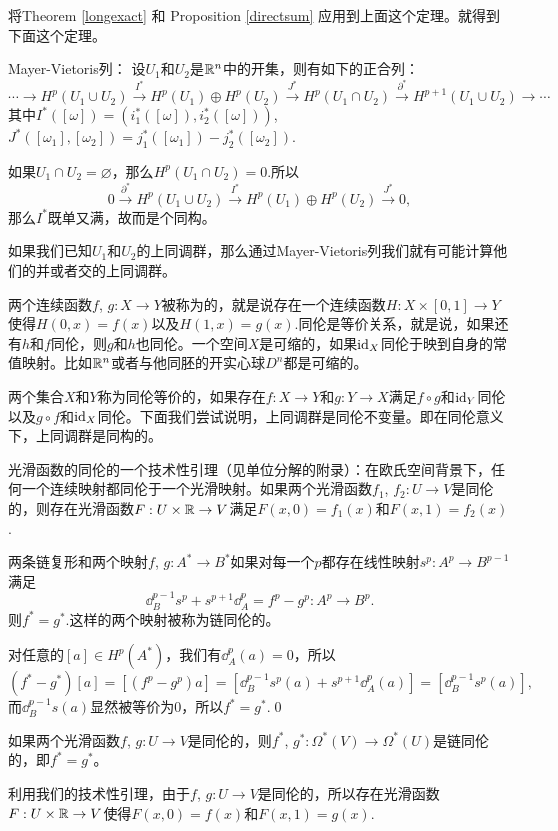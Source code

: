 将Theorem \eqref{longexact} 和 Proposition \eqref{directsum} 应用到上面这个定理。就得到下面这个定理。

\theo Mayer-Vietoris列：
设$U_1$和$U_2$是$\mathbb{R}^n$中的开集，则有如下的正合列：
\[
\cdots\to H^p(U_1\cup U_2)\xrightarrow{I^*}H^p(U_1)\oplus H^p(U_2)\xrightarrow{J^*}H^p(U_1\cap U_2)\xrightarrow{\partial^*}H^{p+1}(U_1\cup U_2)
\to \cdots
\]
其中$I^*([\omega])=(i_1^*([\omega]),i_2^*([\omega]))$,$J^*([\omega_1],[\omega_2])=j_1^*([\omega_1])-j_2^*([\omega_2])$.

如果$U_1\cap U_2=\varnothing$，那么$H^p(U_1\cap U_2)=0$.所以
\[
0\xrightarrow{\partial^*} H^p(U_1\cup U_2)\xrightarrow{I^*}H^p(U_1)\oplus H^p(U_2)\xrightarrow{J^*}0,
\]
那么$I^*$既单又满，故而是个同构。

如果我们已知$U_1$和$U_2$的上同调群，那么通过Mayer-Vietoris列我们就有可能计算他们的并或者交的上同调群。

\para \label{homotopy}两个连续函数$f$, $g:X\to Y$被称为的，就是说存在一个连续函数$H:X\times [0,1]\to Y$使得$H(0,x)=f(x)$以及$H(1,x)=g(x)$.同伦是等价关系，就是说，如果还有$h$和$f$同伦，则$g$和$h$也同伦。一个空间$X$是可缩的，如果$\operatorname{id}_X$同伦于映到自身的常值映射。比如$\mathbb{R}^n$或者与他同胚的开实心球$D^n$都是可缩的。

两个集合$X$和$Y$称为同伦等价的，如果存在$f:X\to Y$和$g:Y\to X$满足$f\circ g$和$\operatorname{id}_Y$同伦以及$g\circ f$和$\operatorname{id}_X$同伦。下面我们尝试说明，上同调群是同伦不变量。即在同伦意义下，上同调群是同构的。

\lem 光滑函数的同伦的一个技术性引理（见单位分解的附录）：在欧氏空间背景下，任何一个连续映射都同伦于一个光滑映射。如果两个光滑函数$f_1$, $f_2:U\to V$是同伦的，则存在光滑函数$F:U\times \mathbb{R}\to V$满足$F(x,0)=f_1(x)$和$F(x,1)=f_2(x)$.

\pro 两条链复形和两个映射$f$, $g:A^*\to B^*$如果对每一个$p$都存在线性映射$s^p:A^p \to B^{p-1}$满足
\[
\dd_B^{p-1}s^p+s^{p+1}\dd_A^p=f^p-g^p:A^p\to B^p.
\]
则$f^*=g^*$.这样的两个映射被称为链同伦的。

\proof 对任意的$[a]\in H^p(A^*)$，我们有$\dd_A^p(a)=0$，所以
\[
(f^*-g^*)[a]=[(f^p-g^p)a]=[\dd^{p-1}_Bs^p(a)+s^{p+1}\dd_A^p(a)]=[\dd^{p-1}_Bs^p(a)],
\]
而$\dd^{p-1}_Bs(a)$显然被等价为0，所以$f^*=g^*$.\qed

\pro 如果两个光滑函数$f$, $g:U\to V$是同伦的，则$
f^*$, $g^*:\Omega^*(V)\to \Omega^*(U)$是链同伦的，即$f^*=g^*$。

\proof 利用我们的技术性引理，由于$f$, $g:U\to V$是同伦的，所以存在光滑函数$F:U\times \mathbb{R} \to V$使得$F(x,0)=f(x)$和$F(x,1)=g(x)$.

